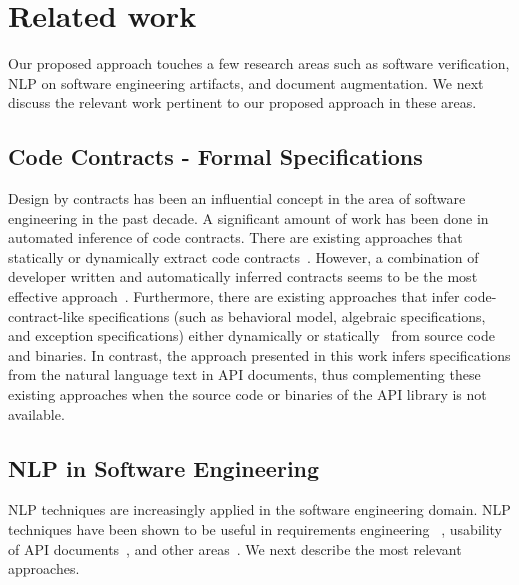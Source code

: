 \section{Related work}
\label{sec:related}


Our proposed approach touches a few research areas such as software verification,
NLP on software engineering artifacts, and document augmentation.
We next discuss the relevant work pertinent to our proposed approach in these areas.

\subsection{Code Contracts - Formal Specifications}
Design by contracts has been an influential concept in the area of software engineering in the past decade.
A significant amount of work has been done in automated inference of code contracts.
There are existing approaches that statically or dynamically extract code contracts~\cite{csallner08dysy,NimmerE02:ISSTA,Tillmann:2006:DLM:2105385.2105433}. However, a combination of developer written and automatically inferred contracts seems to be the most effective approach~\cite{Polikarpova2009ISSTA,Flanagan2001:HAA}.
Furthermore, there are existing approaches that infer code-contract-like specifications
(such as behavioral model, algebraic specifications, and exception specifications) either dynamically\cite{Henkel07discoveringdocumentation,Ghezzi:2009:SIB:1555001.1555057,Henkel:2008:DDA:1363102.1363105} or statically~\cite{Flanagan2001:HAA,Buse:2008:ADI:1390630.1390664} from source code and binaries.
In contrast, the approach presented in this work infers specifications from the natural language text in API documents,
thus complementing these existing approaches when the source code or binaries of the API library is not available.


\subsection{NLP in Software Engineering}

NLP techniques are increasingly applied in the software engineering domain. 
NLP techniques have been shown to be useful in requirements engineering ~\cite{Sinha2009,Sinha2010,Gervasi2005},
usability of API documents~\cite{Dekel2009}, and other areas~\cite{Zhou2008,Little2009,pandita13:WHYPER}.
We next describe the most relevant approaches.


